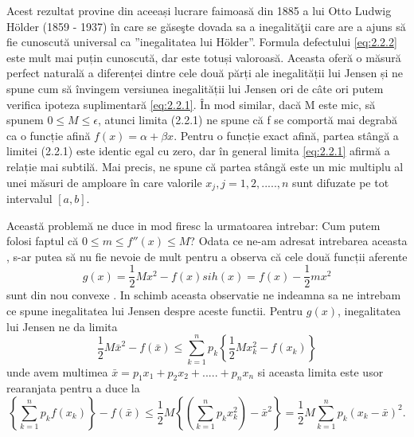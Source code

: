 \documentclass[a4paper,12pt,oneside]{report}
\begin{document}
Acest rezultat provine din aceeași lucrare faimoasă din 1885 a lui Otto Ludwig Hölder (1859 - 1937) în care se găseşte dovada sa a inegalităţii care are a ajuns să fie cunoscută universal ca ”inegalitatea lui Hölder”. Formula defectului \ref{eq:2.2.2} este mult mai puțin cunoscută, dar este totuși valoroasă. Aceasta oferă o măsură perfect naturală a diferenței dintre cele două părți ale inegalității lui Jensen și ne spune cum să învingem versiunea  inegalității lui Jensen ori de câte ori putem verifica ipoteza suplimentară \ref{eq:2.2.1}. 
În mod similar, dacă M este mic, să spunem \(0 \leq M \leq \epsilon\), atunci limita (2.2.1) ne spune că f se comportă mai degrabă ca o funcție afină \(f\left ( x \right ) = \alpha  + \beta x\). Pentru o funcție exact afină, partea stângă a limitei (2.2.1) este identic egal cu zero, dar în general limita \ref{eq:2.2.1} afirmă a relație mai subtilă. Mai precis, ne spune că partea stângă este un mic multiplu al unei măsuri de amploare  în care valorile \(x_{j}, j = 1,2,.....,n \) sunt difuzate pe tot intervalul \(\left [ a, b \right ]. \)

Această problemă ne duce in mod firesc la urmatoarea intrebar: Cum putem folosi faptul că \(0\leq m\leq {f}''\left ( x \right )\leq M \)? Odata ce ne-am adresat intrebarea aceasta , s-ar putea să nu fie nevoie de mult pentru a observa că cele două funcții aferente
\begin{displaymath}
  g\left ( x \right ) = \frac{1}{2}Mx^{2} - f\left ( x \right ) si 
h\left ( x \right ) = f\left ( x \right ) - \frac{1}{2}mx^{2}
\end{displaymath}
sunt din nou convexe . In schimb aceasta observatie ne indeamna sa ne intrebam ce spune inegalitatea lui Jensen despre aceste functii. 
	Pentru \(g\left ( x \right )\), inegalitatea lui Jensen ne da limita 
\begin{displaymath}
  \frac{1}{2}M\bar{x}^{2} - f\left ( \bar{x} \right )\leq \sum_{k = 1}^{n}p_{k}\left \{ \frac{1}{2}Mx_{k}^{2} - f\left ( x_{k} \right )\right \}
\end{displaymath}
unde avem multimea \(\bar{x} = p_{1}x_{1}+ p_{2}x_{2}+ ..... + p_{n}x_{n}\) si aceasta limita este usor rearanjata pentru a duce la 
\begin{displaymath}
  \left \{ \sum_{k = 1}^{n} p_{k}f\left ( x_{k} \right )\right \} - f\left (\bar{x}  \right )\leq \frac{1}{2}M\left \{ \left ( \sum_{k=1}^{n} p_{k}x_{k}^{2}\right ) - \bar{x}^{2} \right \} = \frac{1}{2}M\sum_{k = 1}^{n}p_{k}\left ( x_{k} - \bar{x} \right )^{2}. 
\end{displaymath}
\end{document}
